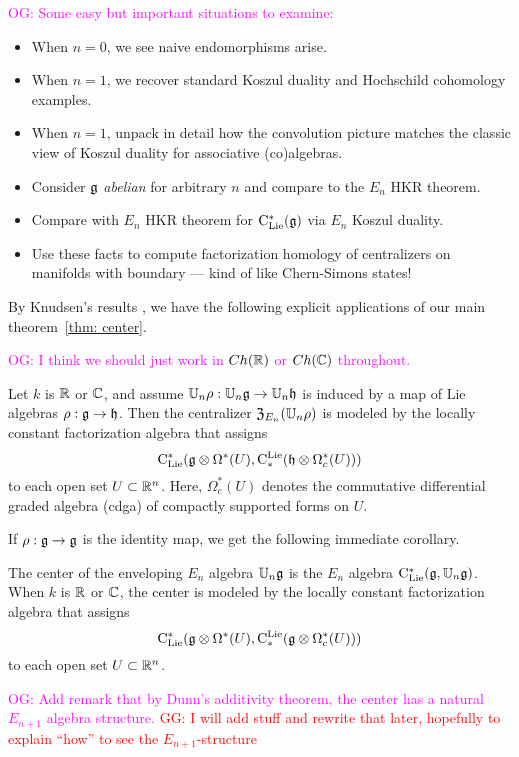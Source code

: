 \documentclass[11pt]{amsart}
\numberwithin{equation}{section}
\def\owen{\textcolor{magenta}{OG: }\textcolor{magenta}}
\def\greg{\textcolor{red}{GG: }\textcolor{red}}
\begin{document}
\owen{Some easy but important situations to examine:}
\begin{itemize}
\item When $n=0$, we see naive endomorphisms arise.
\item When $n=1$, we recover standard Koszul duality and Hochschild cohomology examples.
\item When $n=1$, unpack in detail how the convolution picture matches the classic view of Koszul duality for associative (co)algebras.
\item Consider $\mathfrak g$ {\em abelian} for arbitrary $n$ and compare to the $E_n$ HKR theorem.
\item Compare with $E_n$ HKR theorem for ${\rm C}_{\rm Lie}^*(\mathfrak g)$ via $E_n$ Koszul duality.
\item Use these facts to compute factorization homology of centralizers on manifolds with boundary --- kind of like Chern-Simons states!
\end{itemize}


By Knudsen's results \cite{Knudsen}, we have the following explicit applications of our main theorem~\ref{thm: center}.

\owen{I think we should just work in $Ch(\mathbb R)$ or $Ch(\mathbb C)$ throughout.}

\begin{cor}\label{cor:centerfactorization}
Let $k$ is $\mathbb R$ or $\mathbb C$, and assume $\mathbb U_n \rho:  \mathbb U_n \mathfrak g \to \mathbb U_n \mathfrak h$ is induced by a map of Lie algebras $\rho: \mathfrak g \to \mathfrak h$. 
Then the centralizer ${\frak Z}_{E_n}(\mathbb U_n \rho)$ is modeled by the locally constant factorization algebra that assigns
\[
{\rm C}_{\rm Lie}^*(\mathfrak g \otimes \Omega^*(U), {\rm C}^{\rm Lie}_*( \mathfrak h \otimes \Omega^*_c(U)))
\]
to each open set $U \subset \mathbb R^n$. Here, $\Omega^*_c(U)$ denotes the commutative differential graded algebra (cdga) of compactly supported forms on $U$.
\end{cor}

If $\rho: \mathfrak g \to \mathfrak g$ is the identity map, we get the following immediate corollary.

\begin{cor}
\label{thm: center}
The center of the enveloping $E_n$ algebra $\mathbb U_n\mathfrak g$ is the $E_n$ algebra ${\rm C}_{\rm Lie}^*(\mathfrak g, \mathbb U_n\mathfrak g)$. 
When $k$ is $\mathbb R$ or $\mathbb C$, the 
center is modeled by the locally constant factorization algebra that assigns
\[
{\rm C}_{\rm Lie}^*(\mathfrak g \otimes \Omega^*(U), {\rm C}^{\rm Lie}_*( \mathfrak g \otimes \Omega^*_c(U)))
\]
to each open set $U \subset \mathbb R^n$.
\end{cor}

\owen{Add remark that by Dunn's additivity theorem, the center has a natural $E_{n+1}$ algebra structure.}
\greg{I will add stuff and rewrite that later, hopefully to explain ``how'' to see the $E_{n+1}$-structure}
\end{document}

